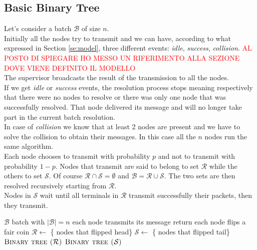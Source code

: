 \documentclass[11pt,a4paper,twoside,openright]{book}
\newcommand{\rev}[1]{\textcolor{Cerulean}{#1}}
\newcommand{\algname}[1]{\ensuremath{\mbox{\sc #1}}}
\begin{document}
\subsection{Basic Binary Tree}
\label{basicbinarytreedescription}
Let's consider a batch $\mathcal{B}$ of size $n$.\\
\rev{Initially all the nodes try to transmit and we can have, according to what expressed in Section \ref{se:model}, three different events: \emph{idle}, \emph{success}, \emph{collision}.}\textcolor{red}{ AL POSTO DI SPIEGARE HO MESSO UN RIFERIMENTO ALLA SEZIONE DOVE VIENE DEFINITO IL MODELLO}\\
The supervisor broadcasts the result of the transmission to all the nodes.\\
If we get \emph{idle} or  \emph{success} events, the resolution process stops meaning respectively that there were no nodes to resolve or there was only one node that was successfully resolved. That node delivered its message and will no longer take part in the current batch resolution.\\
In case of \emph{collision} we know that at least 2 nodes are present and we have to solve the collision to obtain their messages. In this case all the $n$ nodes run the same algorithm.\\
Each node chooses to transmit with probability $p$ and not to transmit with probability $1-p$. Nodes that transmit  are said to belong to set $\mathcal{R}$ while the others to set $\mathcal{S}$. Of course $\mathcal{R}  \cap \mathcal{S} = \emptyset$ and $\mathcal{B} = \mathcal{R}  \cup \mathcal{S}$. The two sets are then resolved recursively starting from $\mathcal{R}$.\\
Nodes in $\mathcal{S}$ wait until all terminals in $\mathcal{R}$ transmit successfully their packets, then they transmit.\\

\begin{algorithm}[h!]
\caption{\algname{binary tree ($\mathcal{B}$)}}
\label{alg:binarytree}
\begin{algorithmic}
\STATE {}
\REQUIRE $\mathcal{B}$ batch with $|\mathcal{B}|=n$
\STATE each node transmits its message
	\STATE return
\ELSE
	\STATE each node flips a fair coin
	\STATE $\mathcal{R} \gets$ \{ nodes that flipped head\}
	\STATE $\mathcal{S} \gets$ \{ nodes that flipped tail\}
	\STATE \algname{Binary tree ($\mathcal{R}$)}
	\STATE \algname{Binary tree ($\mathcal{S}$)}
\ENDIF
\end{algorithmic}
\end{algorithm}
\end{document}
